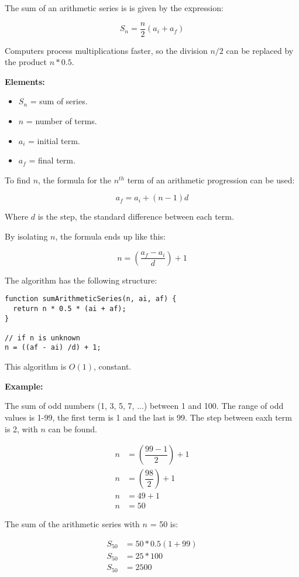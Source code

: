 The sum of an arithmetic series is is given by the expression:

\[\boxed{
  S_n = \dfrac{n}{2}\left(a_i+a_f\right)
}\]

Computers process multiplications faster, so the division $n/2$ can be replaced by the product $n*0.5$.

\textbf{Elements:}

\begin{itemize}
  \item $S_n$ = sum of series.
  \item $n$ = number of terms.
  \item $a_i$ = initial term.
  \item $a_f$ = final term.
\end{itemize}

To find $n$, the formula for the $n^{th}$ term of an arithmetic progression can be used:

\[\boxed{
  a_f = a_i + (n-1)d
}\]

Where $d$ is the step, the standard difference between each term.

By isolating $n$, the formula ends up like this:

\[\boxed{
  n = \left(\dfrac{a_f-a_i}{d}\right)+1
}\]

The algorithm has the following structure:

\begin{lstlisting}[style=general]
function sumArithmeticSeries(n, ai, af) {
  return n * 0.5 * (ai + af);
}

// if n is unknown
n = ((af - ai) /d) + 1;
\end{lstlisting}

This algorithm is $O(1)$, constant.

\textbf{Example:}

The sum of odd numbers (1, 3, 5, 7, ...) between 1 and 100. The range of odd values is 1-99, the first term is 1 and the last is 99. The step between eaxh term is 2, with $n$ can be found.

\begin{align*}
  n &= \left(\dfrac{99-1}{2}\right)+1 \\
  n &= \left(\dfrac{98}{2}\right)+1 \\
  n &= 49+1 \\
  n &= 50
\end{align*}

The sum of the arithmetic series with $n$ = 50 is:

\begin{align*}
  S_{50} &= 50*0.5\left(1+99\right) \\
  S_{50} &= 25*100 \\
  S_{50} &= 2500
\end{align*}
